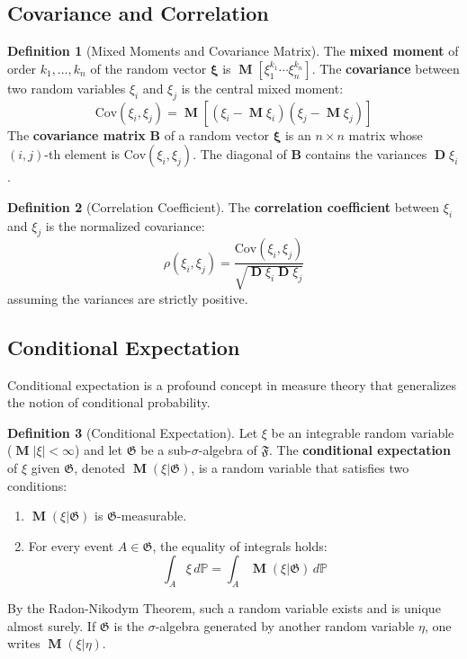 \documentclass[12pt, openany]{book}
\theoremstyle{definition}
\newtheorem{definition}{Definition}[section]
\theoremstyle{plain}
\theoremstyle{remark}
\newcommand{\probP}{\mathbb{P}}
\newcommand{\germF}{\mathfrak{F}} %
\DeclareMathOperator{\M}{\mathbf{M}} %
\DeclareMathOperator{\D}{\mathbf{D}} %
\begin{document}
\subsection{Covariance and Correlation}

\begin{definition}[Mixed Moments and Covariance Matrix]
The \textbf{mixed moment} of order $k_1, \dots, k_n$ of the random vector $\boldsymbol{\xi}$ is $\M[\xi_1^{k_1} \cdots \xi_n^{k_n}]$.
The \textbf{covariance} between two random variables $\xi_i$ and $\xi_j$ is the central mixed moment:
$$ \mathrm{Cov}(\xi_i, \xi_j) = \M[(\xi_i - \M\xi_i)(\xi_j - \M\xi_j)] $$
The \textbf{covariance matrix} $\mathbf{B}$ of a random vector $\boldsymbol{\xi}$ is an $n \times n$ matrix whose $(i,j)$-th element is $\mathrm{Cov}(\xi_i, \xi_j)$. The diagonal of $\mathbf{B}$ contains the variances $\D\xi_i$.
\end{definition}

\begin{definition}[Correlation Coefficient]
The \textbf{correlation coefficient} between $\xi_i$ and $\xi_j$ is the normalized covariance:
$$ \rho(\xi_i, \xi_j) = \frac{\mathrm{Cov}(\xi_i, \xi_j)}{\sqrt{\D\xi_i \D\xi_j}} $$
assuming the variances are strictly positive.
\end{definition}

\subsection{Conditional Expectation}

Conditional expectation is a profound concept in measure theory that generalizes the notion of conditional probability.

\begin{definition}[Conditional Expectation]
Let $\xi$ be an integrable random variable ($\M|\xi| < \infty$) and let $\mathfrak{G}$ be a sub-$\sigma$-algebra of $\germF$. The \textbf{conditional expectation} of $\xi$ given $\mathfrak{G}$, denoted $\M(\xi | \mathfrak{G})$, is a random variable that satisfies two conditions:
\begin{enumerate}
    \item $\M(\xi | \mathfrak{G})$ is $\mathfrak{G}$-measurable.
    \item For every event $A \in \mathfrak{G}$, the equality of integrals holds:
    $$ \int_A \xi \,d\probP = \int_A \M(\xi | \mathfrak{G}) \,d\probP $$
\end{enumerate}
By the Radon-Nikodym Theorem, such a random variable exists and is unique almost surely. If $\mathfrak{G}$ is the $\sigma$-algebra generated by another random variable $\eta$, one writes $\M(\xi|\eta)$.
\end{definition}
\end{document}

